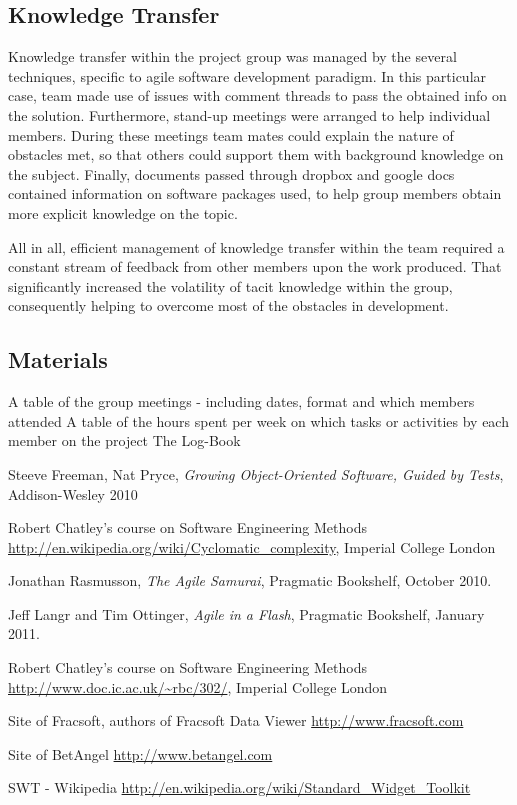 \documentclass[10pt]{article}
\begin{document}
\subsection{Knowledge Transfer}

Knowledge transfer within the project group was managed by the several techniques, specific to agile software development paradigm. In this particular case, team made use of issues with comment threads to pass the obtained info on the solution. Furthermore, stand-up meetings were arranged to help individual members. During these meetings team mates could explain the nature of obstacles met, so that others could support them with background knowledge on the subject. Finally, documents passed through dropbox and google docs contained information on software packages used, to help group members obtain more explicit knowledge on the topic.

All in all, efficient management of knowledge transfer within the team required a constant stream of feedback from other members upon the work produced. That significantly increased the volatility of tacit knowledge within the group, consequently helping to overcome most of the obstacles in development.

\subsection{Materials}

A table of the group meetings - including dates, format and which members attended
A table of the hours spent per week on which tasks or activities by each member on the project
The Log-Book

\begin{thebibliography}{9}
  Steeve Freeman, Nat Pryce,
  \emph{Growing Object-Oriented Software, Guided by Tests}, Addison-Wesley 2010

  Robert Chatley's course on Software Engineering Methods
  \url{http://en.wikipedia.org/wiki/Cyclomatic_complexity},
  Imperial College London

  Jonathan Rasmusson,
  \emph{The Agile Samurai},
  Pragmatic Bookshelf,
  October 2010.

  Jeff Langr and Tim Ottinger,
  \emph{Agile in a Flash},
  Pragmatic Bookshelf, 
  January 2011.

  Robert Chatley's course on Software Engineering Methods
  \url{http://www.doc.ic.ac.uk/~rbc/302/},
  Imperial College London

  Site of Fracsoft, authors of Fracsoft Data Viewer
  \url{http://www.fracsoft.com}

  Site of BetAngel
  \url{http://www.betangel.com}
  
  SWT - Wikipedia
  \url{http://en.wikipedia.org/wiki/Standard_Widget_Toolkit}

\end{thebibliography}
\end{document}
